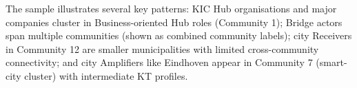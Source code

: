 \documentclass[review,12pt]{elsarticle}
\begin{document}
The sample illustrates several key patterns: KIC Hub organisations and major companies cluster in Business-oriented Hub roles (Community 1); Bridge actors span multiple communities (shown as combined community labels); city Receivers in Community 12 are smaller municipalities with limited cross-community connectivity; and city Amplifiers like Eindhoven appear in Community 7 (smart-city cluster) with intermediate KT profiles.



\end{document}
